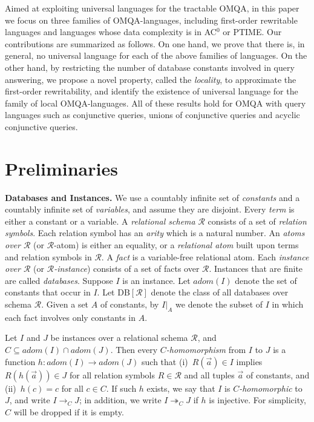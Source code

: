 \documentclass[letterpaper]{article} %
\theoremstyle{definition}
\theoremstyle{remark}
\theoremstyle{definition}
\begin{document}
Aimed at exploiting universal languages for the tractable OMQA, in this paper we focus on three families of OMQA-languages, including first-order rewritable languages and languages whose data complexity is in AC$^0$ or PTIME. Our contributions are summarized as follows. On one hand, we prove that there is, in general, no universal language for each of the above families of languages. On the other hand, by restricting the number of database constants involved in query answering, we propose a novel property, called the {\em locality}, to approximate the first-order rewritability, and identify the existence of universal language for the family of local OMQA-languages. All of these results hold for OMQA with query languages such as conjunctive queries, unions of conjunctive queries and acyclic conjunctive queries.

\section{Preliminaries}

{\noindent\bf Databases and Instances.} We use a countably infinite set %
of {\em constants} and a countably infinite set %
of {\em variables}, and assume they are disjoint. Every {\em term} is either a constant or a variable. A {\em relational schema} $\mathscr{R}$ consists of a set of {\em relation symbols}. Each relation symbol has an {\em arity} which is a natural number. An {\em atoms over $\mathscr{R}$} (or $\mathscr{R}$-atom) is either an equality, or a {\em relational atom} built upon terms and relation symbols in $\mathscr{R}$. A {\em fact} is a variable-free relational atom. Each {\em instance over $\mathscr{R}$} (or {\em $\mathscr{R}$-instance}) consists of a set of facts over $\mathscr{R}$. Instances that are finite are called {\em databases}. Suppose $I$ is an instance. Let $adom(I)$ denote the set of constants that occur in $I$. Let {DB}$[\mathscr{R}]$ denote the class of all databases over schema $\mathscr{R}$. Given a set $A$ of constants, by $I|_A$ we denote the subset of $I$ in which each fact involves only constants in $A$.

Let $I$ and $J$ be instances over a relational schema $\mathscr{R}$, and $C\subseteq adom(I)\cap adom(J)$. Then every {\em $C$-homomorphism} from $I$ to $J$ is a function $h:adom(I)\rightarrow adom(J)$ such that (i)~$R(\vec{a})\in I$ implies $R(h(\vec{a}))\in J$ for all relation symbols $R\in\mathscr{R}$ and all tuples $\vec{a}$ of constants, and (ii)~$h(c)=c$ for all $c\in C$. If such $h$ exists, we say that $I$ is {\em $C$-homomorphic} to $J$, and write $I\rightarrow_C J$; in addition, we write $I\twoheadrightarrow_C J$ if $h$ is injective. For simplicity, $C$ will be dropped if it is empty. 
\end{document}
